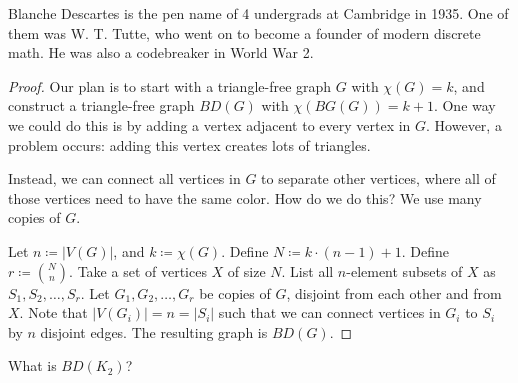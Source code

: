 \begin{note}
	Blanche Descartes is the pen name of 4 undergrads at Cambridge in 1935. One of them was W. T. Tutte, who went on to become a founder of modern discrete math. He was also a codebreaker in World War 2.
\end{note}

\begin{proof}
	Our plan is to start with a triangle-free graph \( G \) with \( \chi(G) = k \), and construct a triangle-free graph \( BD(G) \) with \( \chi (BG(G))= k+1 \). One way we could do this is by adding a vertex adjacent to every vertex in \( G \). However, a problem occurs: adding this vertex creates lots of triangles. \par
	Instead, we can connect all vertices in \( G \) to separate other vertices, where all of those vertices need to have the same color. How do we do this? We use many copies of \( G \). \par
	Let \( n \coloneq |V(G)| \), and \( k \coloneq \chi (G) \). Define \( N \coloneq k\cdot (n - 1) + 1 \). Define \( r \coloneq \binom{N}{n} \). Take a set of vertices \( X \) of size \( N \). List all \( n \)-element subsets of \( X \) as \( S_{1}, S_{2}, \ldots , S_r \). Let \( G_{1}, G_{2}, \ldots , G_r \) be copies of \( G \), disjoint from each other and from \( X \). Note that \( |V(G_i)| = n = |S_i| \) such that we can connect vertices in \( G_i \) to \( S_i \) by \( n \) disjoint edges. The resulting graph is \( BD(G) \).
\end{proof}

What is \( BD(K_2) \)?
